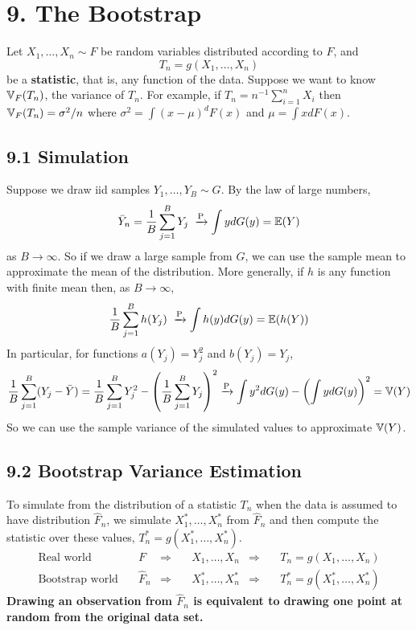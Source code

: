 \section*{9. The Bootstrap}\label{the-bootstrap}
Let \(X_{1}, \dots, X_{n} \sim F\) be random variables distributed according
to \(F\), and
\[
T_{n} = g(X_{1}, \dots, X_{n})
\]
be a \textbf{statistic}, that is, any function of the data. Suppose we
want to know \(\operatorname{\mathbb{V}}_F(T_{n})\), the variance of \(T_{n}\).
For example, if \(T_{n} = n^{-1}\sum_{i=1}^{n}X_{i}\) then
\(\operatorname{\mathbb{V}}_F(T_{n}) = \sigma^{2}/n\) where
\(\sigma^{2} = \int (x - \mu)^{d}F(x)\) and \(\mu = \int x dF(x)\).

\subsection*{9.1 Simulation}\label{bootstrap:simulation}
Suppose we draw iid samples \(Y_{1}, \dots, Y_B \sim G\). By the law of
large numbers,
\[
\bar{Y}_{n} = \frac{1}{B} \sum_{j=1}^B Y_{j} \; \xrightarrow{\textrm{P}} \int y dG(y) = \operatorname{\mathbb{E}}(Y)
\]
as \(B \rightarrow \infty\). So if we draw a large sample from \(G\), we
can use the sample mean to approximate the mean of the distribution.
More generally, if \(h\) is any function with finite mean then, as
\(B \rightarrow \infty\),
\[
\frac{1}{B} \sum_{j=1}^B h(Y_{j}) \; \xrightarrow{\textrm{P}} \int h(y) dG(y) = \operatorname{\mathbb{E}}(h(Y))
\]
In particular, for functions \(a(Y_{j}) = Y_{j}^{2}\) and \(b(Y_{j}) = Y_{j}\),
\[
\frac{1}{B} \sum_{j=1}^B (Y_{j} - \bar{Y}) 
= \frac{1}{B} \sum_{j=1}^B Y_{j}^{2} - \left(\frac{1}{B} \sum_{j=1}^B Y_{j} \right)^{2}
\xrightarrow{\textrm{P}} \int y^{2} dG(y) - \left( \int y dG(y) \right)^{2} = \VAR(Y)
\]
So we can use the sample variance of the simulated values to approximate
\(\operatorname{\mathbb{V}}(Y)\).

\subsection*{9.2 Bootstrap Variance
Estimation}\label{bootstrap:variance}
To simulate from the distribution of a statistic \(T_{n}\) when the data
is assumed to have distribution \(\hat{F}_{n}\), we simulate
\(X_{1}^{*}, \dots, X_{n}^{*}\) from \(\hat{F}_{n}\) and then compute the
statistic over these values, \(T_{n}^{*} = g(X_{1}^{*}, \dots, X_{n}^{*})\).
\begin{align*}
\text{Real world} \quad      & F         & \Longrightarrow\quad & X_{1}, \dots, X_{n}        & \Longrightarrow & \quad T_{n} = g(X_{1}, \dots, X_{n}) \\
\text{Bootstrap world} \quad & \hat{F}_{n} & \Longrightarrow\quad  & X_{1}^{*}, \dots, X_{n}^{*} & \Longrightarrow & \quad T_{n}^{*} = g(X_{1}^{*}, \dots, X_{n}^{*})
\end{align*}
\textbf{Drawing an observation from \(\hat{F}_{n}\) is equivalent to
drawing one point at random from the original data set.}
